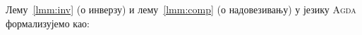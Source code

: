 Лему~\ref{lmm:inv} (о инверзу) и лему~\ref{lmm:comp} (о надовезивању) у језику \textsc{Agda} формализујемо као:
\begin{code}%
\>[0]%
\>[1147I]\AgdaSymbol{:}\AgdaSpace{}%
\AgdaSymbol{\{}\AgdaSpace{}%
\AgdaSymbol{:}\AgdaSpace{}%
\AgdaSpace{}%
\AgdaSpace{}%
\AgdaSymbol{\}}\AgdaSpace{}%
\AgdaSymbol{\{}\AgdaSpace{}%
\AgdaSpace{}%
\AgdaSymbol{:}\AgdaSpace{}%
\AgdaSymbol{\}}\<%
\\
\>[.][@{}l@{}]\<[1147I]%
\>[4]\AgdaSpace{}%
\AgdaSpace{}%
\AgdaOperator{\AgdaFunction{==}}\AgdaSpace{}%
\AgdaSpace{}%
\AgdaSpace{}%
\AgdaSpace{}%
\AgdaOperator{\AgdaFunction{==}}\AgdaSpace{}%
\<%
\\
\>[0]\AgdaSymbol{(}\AgdaSpace{}%
\AgdaSymbol{)}\AgdaSpace{}%
\AgdaSpace{}%
\AgdaSymbol{=}\AgdaSpace{}%
\AgdaSpace{}%
\<%
\\
%
\\[\AgdaEmptyExtraSkip]%
\>[0]\AgdaSpace{}%
\AgdaSpace{}%
\<%
\\
%
\\[\AgdaEmptyExtraSkip]%
\>[0]%
\>[1171I]\AgdaSymbol{:}\AgdaSpace{}%
\AgdaSymbol{\{}\AgdaSpace{}%
\AgdaSymbol{:}\AgdaSpace{}%
\AgdaSpace{}%
\AgdaSpace{}%
\AgdaSymbol{\}}\AgdaSpace{}%
\AgdaSymbol{\{}\AgdaSpace{}%
\AgdaSpace{}%
\AgdaSpace{}%
\AgdaSymbol{:}\AgdaSpace{}%
\AgdaSymbol{\}}\<%
\\
\>[.][@{}l@{}]\<[1171I]%
\>[4]\AgdaSpace{}%
\AgdaSpace{}%
\AgdaOperator{\AgdaFunction{==}}\AgdaSpace{}%
\AgdaSpace{}%
\AgdaSpace{}%
\AgdaSpace{}%
\AgdaOperator{\AgdaFunction{==}}\AgdaSpace{}%
\AgdaSpace{}%
\AgdaSpace{}%
\AgdaSpace{}%
\AgdaOperator{\AgdaFunction{==}}\AgdaSpace{}%
\<%
\\
\>[0]\AgdaSpace{}%
\AgdaSymbol{\AgdaUnderscore{}}\AgdaSpace{}%
\AgdaSpace{}%
\AgdaSpace{}%
\AgdaSymbol{=}\AgdaSpace{}%
\<%
\end{code}
